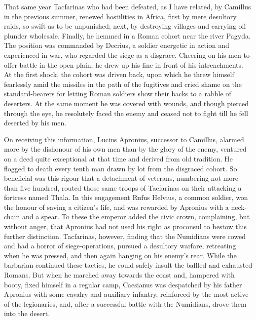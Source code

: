 That same year Tacfarinas who had been defeated, as I have related, by Camillus in the previous summer, renewed hostilities in Africa, first by mere desultory raids, so swift as to be unpunished; next, by destroying villages and carrying off plunder wholesale. Finally, he hemmed in a Roman cohort near the river Pagyda. The position was commanded by Decrius, a soldier energetic in action and experienced in war, who regarded the siege as a disgrace. Cheering on his men to offer battle in the open plain, he drew up his line in front of his intrenchments. At the first shock, the cohort was driven back, upon which he threw himself fearlessly amid the missiles in the path of the fugitives and cried shame on the standard-bearers for letting Roman soldiers show their backs to a rabble of deserters. At the same moment he was covered with wounds, and though pierced through the eye, he resolutely faced the enemy and ceased not to fight till he fell deserted by his men.


On receiving this information, Lucius Apronius, successor to Camillus, alarmed more by the dishonour of his own men than by the glory of the enemy, ventured on a deed quite exceptional at that time and derived from old tradition. He flogged to death every tenth man drawn by lot from the disgraced cohort. So beneficial was this rigour that a detachment of veterans, numbering not more than five hundred, routed those same troops of Tacfarinas on their attacking a fortress named Thala. In this engagement Rufus Helvius, a common soldier, won the honour of saving a citizen's life, and was rewarded by Apronius with a neck-chain and a spear. To these the emperor added the civic crown, complaining, but without anger, that Apronius had not used his right as proconsul to bestow this further distinction. Tacfarinas, however, finding that the Numidians were cowed and had a horror of siege-operations, pursued a desultory warfare, retreating when he was pressed, and then again hanging on his enemy's rear. While the barbarian continued these tactics, he could safely insult the baffled and exhausted Romans. But when he marched away towards the coast and, hampered with booty, fixed himself in a regular camp, Caesianus was despatched by his father Apronius with some cavalry and auxiliary infantry, reinforced by the most active of the legionaries, and, after a successful battle with the Numidians, drove them into the desert.


